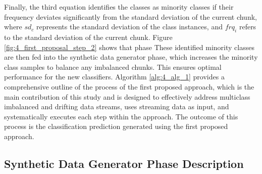 Finally, the third equation identifies the classes as minority classes if their frequency deviates significantly from the standard deviation of the current chunk, where $sd_c$ represents the standard deviation of the class instances, and $frq_i$ refers to the standard deviation of the current chunk.
Figure \ref{fig:4_first_proposal_step_2} shows that phase These identified minority classes are then fed into the synthetic data generator phase, which increases the minority class samples to balance any imbalanced chunks. This ensures optimal performance for the new classifiers. Algorithm  \ref{alg:4_alg_1} provides a comprehensive outline of the process of the first proposed approach, which is the main contribution of this study and is designed to effectively address multiclass imbalanced and drifting data streams, uses streaming data as input, and systematically executes each step within the approach. The outcome of this process is the classification prediction generated using the first proposed approach.

\subsection{Synthetic Data Generator Phase Description}

